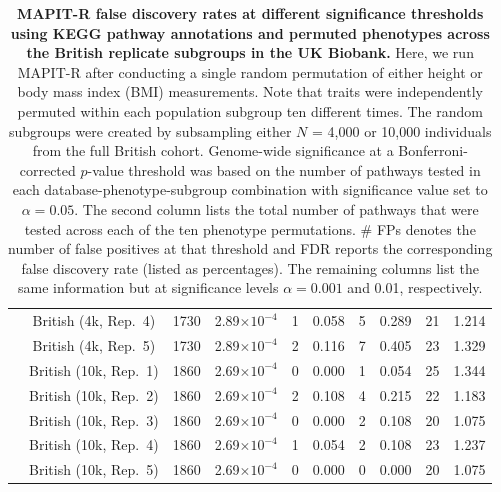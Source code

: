 \documentclass[10pt]{article}
\begin{document}
\begin{landscape}
\begin{table}[ht]
\begin{tabular}{|c|c|c|ccc|cc|cc|}
  & British (4k, Rep.~4) & 1730 & 2.89$\times 10^{-4}$ & 1 & 0.058 & 5 & 0.289 & 21 & 1.214 \\
  & British (4k, Rep.~5) & 1730 & 2.89$\times 10^{-4}$ & 2 & 0.116 & 7 & 0.405 & 23 & 1.329 \\
  & British (10k, Rep.~1) & 1860 & 2.69$\times 10^{-4}$ & 0 & 0.000 & 1 & 0.054 & 25 & 1.344 \\
  & British (10k, Rep.~2) & 1860 & 2.69$\times 10^{-4}$ & 2 & 0.108 & 4 & 0.215 & 22 & 1.183 \\
  & British (10k, Rep.~3) & 1860 & 2.69$\times 10^{-4}$ & 0 & 0.000 & 2 & 0.108 & 20 & 1.075 \\
  & British (10k, Rep.~4) & 1860 & 2.69$\times 10^{-4}$ & 1 & 0.054 & 2 & 0.108 & 23 & 1.237 \\
  & British (10k, Rep.~5) & 1860 & 2.69$\times 10^{-4}$ & 0 & 0.000 & 0 & 0.000 & 20 & 1.075 \\ 
   \hline
\end{tabular}
\caption{\textbf{MAPIT-R false discovery rates at different significance thresholds using KEGG pathway annotations and permuted phenotypes across the British replicate subgroups in the UK Biobank.} Here, we run MAPIT-R after conducting a single random permutation of either height or body mass index (BMI) measurements. Note that traits were independently permuted within each population subgroup ten different times. The random subgroups were created by subsampling either $N$ = 4,000 or 10,000 individuals from the full British cohort. Genome-wide significance at a Bonferroni-corrected $p$-value threshold was based on the number of pathways tested in each database-phenotype-subgroup combination with significance value set to $\alpha = 0.05$. The second column lists the total number of pathways that were tested across each of the ten phenotype permutations. \# FPs denotes the number of false positives at that threshold and FDR reports the corresponding false discovery rate (listed as percentages). The remaining columns list the same information but at significance levels $\alpha = 0.001$ and 0.01, respectively.}
\label{InterPath-Supp-Table-BritReps-FDRs-pt1}
\end{table}
\end{landscape}
\end{document}
